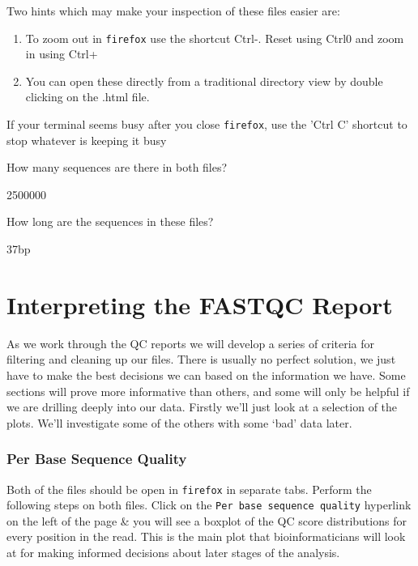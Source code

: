 \begin{note}
Two hints which may make your inspection of these files easier are:
\begin{enumerate}
	\item To zoom out in \texttt{firefox} use the shortcut Ctrl-. Reset using Ctrl0 and zoom in using Ctrl+
	\item You can open these directly from a traditional directory view by double clicking on the .html file.
\end{enumerate}
If your terminal seems busy after you close \texttt{firefox}, use the 'Ctrl C' shortcut to stop whatever is keeping it busy
\end{note}

\begin{questions}
How many sequences are there in both files?\\
\begin{answer}
  2500000 \\
\end{answer}
How long are the sequences in these files?\\
\begin{answer}
  37bp \\
\end{answer}
\end{questions}

\section{Interpreting the FASTQC Report}
\begin{note}
As we work through the QC reports we will develop a series of criteria for filtering and cleaning up our files.
There is usually no perfect solution, we just have to make the best decisions we can based on the information we have.
Some sections will prove more informative than others, and some will only be helpful if we are drilling deeply into our data.
Firstly we'll just look at a selection of the plots.
We'll investigate some of the others with some `bad' data later.
\end{note}

\subsubsection*{Per Base Sequence Quality}
\begin{steps}
Both of the files should be open in \texttt{firefox} in separate tabs.
Perform the following steps on both files.
Click on the \texttt{Per base sequence quality} hyperlink on the left of the page \& you will see a boxplot of the QC score distributions for every position in the read.
This is the main plot that bioinformaticians will look at for making informed decisions about later stages of the analysis.
\end{steps}

